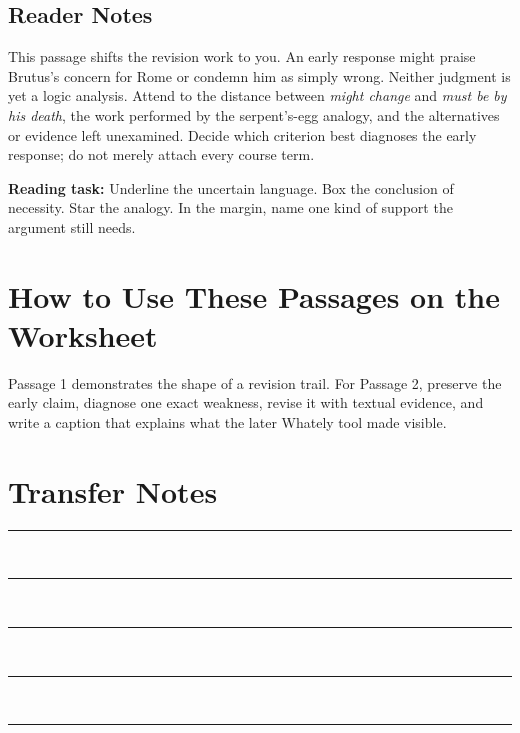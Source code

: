 \documentclass[12pt]{article}
\begin{document}
\subsection*{Reader Notes}
This passage shifts the revision work to you. An early response might praise Brutus's concern for Rome or condemn him as simply wrong. Neither judgment is yet a logic analysis. Attend to the distance between \textit{might change} and \textit{must be by his death}, the work performed by the serpent's-egg analogy, and the alternatives or evidence left unexamined. Decide which criterion best diagnoses the early response; do not merely attach every course term.

\textbf{Reading task:} Underline the uncertain language. Box the conclusion of necessity. Star the analogy. In the margin, name one kind of support the argument still needs.

\section*{How to Use These Passages on the Worksheet}
Passage 1 demonstrates the shape of a revision trail. For Passage 2, preserve the early claim, diagnose one exact weakness, revise it with textual evidence, and write a caption that explains what the later Whately tool made visible.

\vfill
\section*{Transfer Notes}
\noindent\rule{\textwidth}{0.4pt}\\[1.0em]
\rule{\textwidth}{0.4pt}\\[1.0em]
\rule{\textwidth}{0.4pt}\\[1.0em]
\rule{\textwidth}{0.4pt}\\[1.0em]
\rule{\textwidth}{0.4pt}
\end{document}
